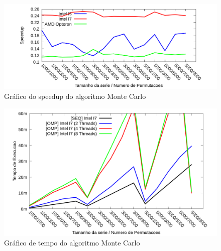 \begin{figure}[H]
\centering
\includegraphics[width=1.0\textwidth]{Imagens/graficos_mcarlo/mcarlo_speedup_omp.png}
\caption{Gráfico do speedup do algoritmo Monte Carlo}
\label{fig:grafico_speedup_mcarlo_omp}
\end{figure}

\begin{figure}[H]
\centering
\includegraphics[width=1.0\textwidth]{Imagens/graficos_mcarlo/mcarlo_tempos_omp_threads.png}
\caption{Gráfico de tempo do algoritmo Monte Carlo}
\label{fig:grafico_speedup_mcarlo_omp_threads}
\end{figure}

